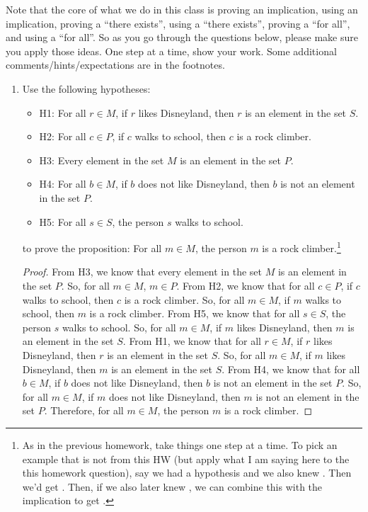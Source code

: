 \documentclass{article}
\begin{document}
\noindent Note that the core of what we do in this class is proving an implication, using an implication, proving a ``there exists'', using a ``there exists'', proving a ``for all'', and using a ``for all''. So as you go through the questions below, please make sure you apply those ideas. One step at a time, show your work. Some additional comments/hints/expectations are in the footnotes.
\begin{enumerate}

      \item Use the following hypotheses:
            \begin{itemize}
                  \item H1: For all $r \in M$, if $r$ likes Disneyland, then $r$ is an element in the
                        set $S$.
                  \item H2: For all $c \in P$, if $c$ walks to school, then $c$ is a rock climber.
                  \item H3: Every element in the set $M$ is an element in the set $P$.
                  \item H4: For all $b \in M$, if $b$ does not like Disneyland, then $b$ is not an
                        element in the set $P$.
                  \item H5: For all $s \in S$, the person $s$ walks to school.
            \end{itemize}
            
            to prove the proposition: For all $m \in M$, the person $m$ is a rock climber.\footnote{As in the previous homework, take things one step at a time. To pick an example that is not from this HW (but apply what I am saying here to the this homework question), say we had a hypothesis  and we also knew . Then we'd get . Then, if we also later knew , we can combine this with the implication to get .}

            \begin{proof}
                  From H3, we know that every element in the set $M$ is an element in the set $P$. So, for all $m \in M$, $m \in P$.
                  From H2, we know that for all $c \in P$, if $c$ walks to school, then $c$ is a rock climber. So, for all $m \in M$, if $m$ walks to school, then $m$ is a rock climber.
                  From H5, we know that for all $s \in S$, the person $s$ walks to school. So, for all $m \in M$, if $m$ likes Disneyland, then $m$ is an element in the set $S$.
                  From H1, we know that for all $r \in M$, if $r$ likes Disneyland, then $r$ is an element in the set $S$. So, for all $m \in M$, if $m$ likes Disneyland, then $m$ is an element in the set $S$.
                  From H4, we know that for all $b \in M$, if $b$ does not like Disneyland, then $b$ is not an element in the set $P$. So, for all $m \in M$, if $m$ does not like Disneyland, then $m$ is not an element in the set $P$.
                  Therefore, for all $m \in M$, the person $m$ is a rock climber.
            \end{proof}


\end{enumerate}
\end{document}
